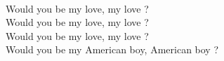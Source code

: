 \\
Would you be my love, my love ? \\
Would you be my love, my love ? \\
Would you be my love, my love ? \\
Would you be my American boy, American boy ? \\
\\
